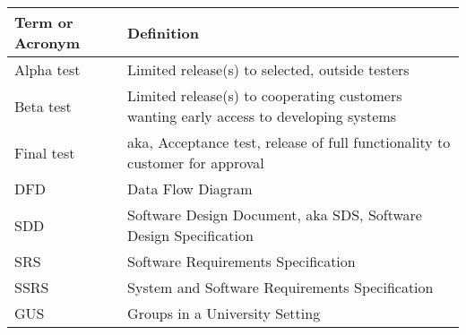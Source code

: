 \begin{tabular}{|p{4cm}|p{10cm}|}
		\hline
		\textbf{Term or Acronym} & \textbf{Definition} \\ \hline
		Alpha test & Limited release(s) to selected, outside testers \\ \hline
		Beta test & Limited release(s) to cooperating customers wanting early access to developing systems \\ \hline
		Final test & aka, Acceptance test, release of full functionality to customer for approval \\ \hline
		DFD & Data Flow Diagram \\ \hline
		SDD & Software Design Document, aka SDS, Software Design Specification \\ \hline
		SRS &  Software Requirements Specification \\ \hline
		SSRS & System and Software Requirements Specification \\ \hline
		GUS & Groups in a University Setting \\ \hline
		\end{tabular}